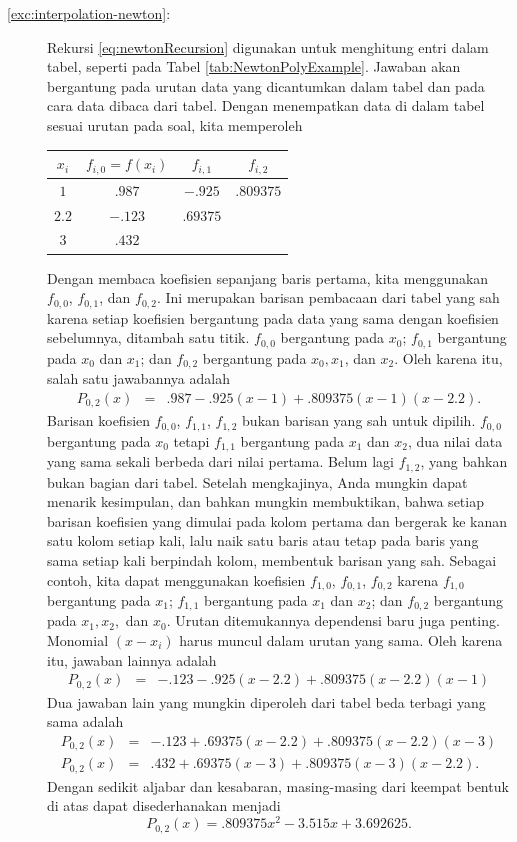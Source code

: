\begin{description}
\item [{\ref{exc:interpolation-newton}:}] Rekursi \ref{eq:newtonRecursion}
digunakan untuk menghitung entri dalam tabel, seperti pada Tabel \ref{tab:NewtonPolyExample}.
Jawaban akan bergantung pada urutan data yang dicantumkan dalam tabel
dan pada cara data dibaca dari tabel. Dengan menempatkan data di dalam
tabel sesuai urutan pada soal, kita memperoleh 

\begin{center}
\begin{tabular}{cccc}
$x_{i}$ & $f_{i,0}=f(x_{i})$ & $f_{i,1}$ & $f_{i,2}$\tabularnewline
\hline 
$1$ & $.987$ & $-.925$ & $.809375$\tabularnewline
$2.2$ & $-.123$ & $.69375$ & \tabularnewline
$3$ & $.432$ &  & \tabularnewline
\end{tabular}
\par\end{center}

Dengan membaca koefisien sepanjang baris pertama, kita menggunakan
$f_{0,0}$, $f_{0,1}$, dan $f_{0,2}$. Ini merupakan barisan pembacaan
dari tabel yang sah karena setiap koefisien bergantung pada data yang
sama dengan koefisien sebelumnya, ditambah satu titik. $f_{0,0}$
bergantung pada $x_{0}$; $f_{0,1}$ bergantung pada $x_{0}$ dan
$x_{1}$; dan $f_{0,2}$ bergantung pada $x_{0},x_{1}$, dan $x_{2}$.
Oleh karena itu, salah satu jawabannya adalah
\begin{eqnarray*}
P_{0,2}(x) & = & .987-.925(x-1)+.809375(x-1)(x-2.2).
\end{eqnarray*}
Barisan koefisien $f_{0,0}$, $f_{1,1}$, $f_{1,2}$ bukan barisan
yang sah untuk dipilih. $f_{0,0}$ bergantung pada $x_{0}$ tetapi
$f_{1,1}$ bergantung pada $x_{1}$ dan $x_{2}$, dua nilai data yang
sama sekali berbeda dari nilai pertama. Belum lagi $f_{1,2}$, yang
bahkan bukan bagian dari tabel. Setelah mengkajinya, Anda mungkin
dapat menarik kesimpulan, dan bahkan mungkin membuktikan, bahwa setiap
barisan koefisien yang dimulai pada kolom pertama dan bergerak ke
kanan satu kolom setiap kali, lalu naik satu baris atau tetap pada
baris yang sama setiap kali berpindah kolom, membentuk barisan yang
sah. Sebagai contoh, kita dapat menggunakan koefisien $f_{1,0}$,
$f_{0,1}$, $f_{0,2}$ karena $f_{1,0}$ bergantung pada $x_{1}$;
$f_{1,1}$ bergantung pada $x_{1}$ dan $x_{2}$; dan $f_{0,2}$ bergantung
pada $x_{1},x_{2},$ dan $x_{0}$. Urutan ditemukannya dependensi
baru juga penting. Monomial $(x-x_{i})$ harus muncul dalam urutan
yang sama. Oleh karena itu, jawaban lainnya adalah
\begin{eqnarray*}
P_{0,2}(x) & = & -.123-.925(x-2.2)+.809375(x-2.2)(x-1)
\end{eqnarray*}
Dua jawaban lain yang mungkin diperoleh dari tabel beda terbagi yang
sama adalah
\begin{eqnarray*}
P_{0,2}(x) & = & -.123+.69375(x-2.2)+.809375(x-2.2)(x-3)\\
P_{0,2}(x) & = & .432+.69375(x-3)+.809375(x-3)(x-2.2).
\end{eqnarray*}
Dengan sedikit aljabar dan kesabaran, masing-masing dari keempat bentuk
di atas dapat disederhanakan menjadi
\[
P_{0,2}(x)=.809375x^{2}-3.515x+3.692625.
\]


\end{description}
